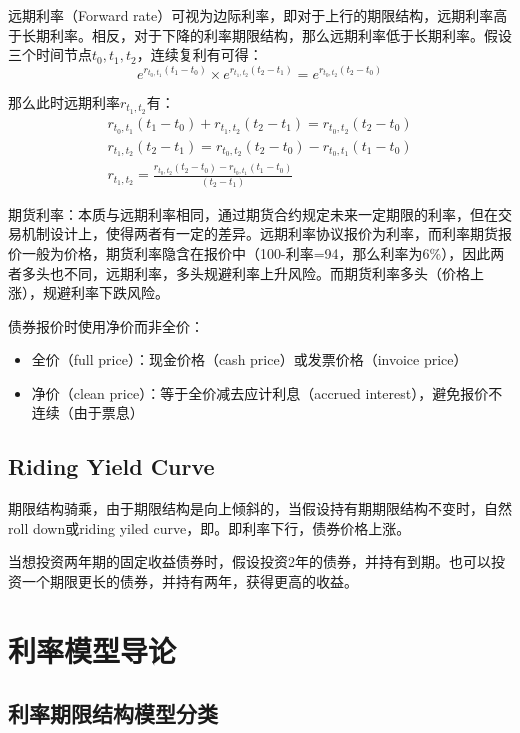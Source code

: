 \documentclass[11pt]{article}
\begin{document}
远期利率（Forward rate）可视为边际利率，即对于上行的期限结构，远期利率高于长期利率。相反，对于下降的利率期限结构，那么远期利率低于长期利率。假设三个时间节点$t_0,t_1,t_2$，连续复利有可得：
\begin{equation*}
    e^{r_{t_0,t_1}(t_1-t_0)} \times e^{r_{t_1,t_2}(t_2-t_1)} = e^{r_{t_0,t_2}(t_2-t_0)}
\end{equation*}

那么此时远期利率$r_{t_1,t_2}$有：
\begin{gather*}
    r_{t_0,t_1}(t_1-t_0) + r_{t_1,t_2}(t_2-t_1) = r_{t_0,t_2}(t_2-t_0) \\
    r_{t_1,t_2}(t_2-t_1) = r_{t_0,t_2}(t_2-t_0) - r_{t_0,t_1}(t_1-t_0) \\
    r_{t_1,t_2} = \frac{r_{t_0,t_2}(t_2-t_0) - r_{t_0,t_1}(t_1-t_0)}{(t_2-t_1)}
\end{gather*}

期货利率：本质与远期利率相同，通过期货合约规定未来一定期限的利率，但在交易机制设计上，使得两者有一定的差异。远期利率协议报价为利率，而利率期货报价一般为价格，期货利率隐含在报价中（100-利率=94，那么利率为6\%），因此两者多头也不同，远期利率，多头规避利率上升风险。而期货利率多头（价格上涨），规避利率下跌风险。

债券报价时使用净价而非全价：
\begin{itemize}
    \item 全价（full price）：现金价格（cash price）或发票价格（invoice price）
    \item 净价（clean price）：等于全价减去应计利息（accrued interest），避免报价不连续（由于票息）
\end{itemize}

\subsection{Riding Yield Curve}

期限结构骑乘，由于期限结构是向上倾斜的，当假设持有期期限结构不变时，自然roll down或riding yiled curve，即。即利率下行，债券价格上涨。

当想投资两年期的固定收益债券时，假设投资2年的债券，并持有到期。也可以投资一个期限更长的债券，并持有两年，获得更高的收益。


\section{利率模型导论}

\subsection{利率期限结构模型分类}
\end{document}
